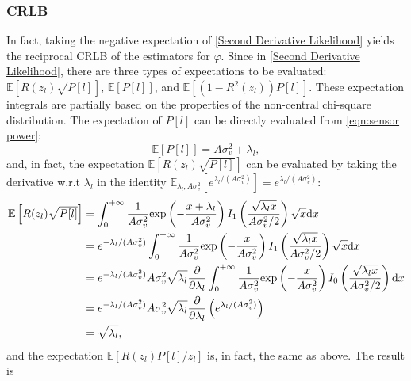 \documentclass[12pt,draftclsnofoot,journal,onecolumn]{IEEEtran}
\theoremstyle{nonumberplain}
\def \exp {\text{exp}}
\begin{document}
\subsubsection{CRLB}
    In fact, taking the negative expectation of \eqref{Second Derivative Likelihood} yields the reciprocal CRLB of the estimators for $\hat{\varphi}$. Since in \eqref{Second Derivative Likelihood}, there are three types of expectations to be evaluated: $\mathbb{E}\left[R(z_l)\sqrt{P[l]}\right]$, $\mathbb{E}\left[P[l]\right]$, and $\mathbb{E}\left[(1-R^2(z_l))P[l]\right]$. These expectation integrals are partially based on the properties of the non-central chi-square distribution. The expectation of $P[l]$ can be directly evaluated from \eqref{eqn:sensor power}:
    \begin{equation}
        \mathbb{E}\left[P[l]\right] = A\sigma_v^2 + \lambda_l,
        \label{eqn:expectation of P_l}
    \end{equation}
    and, in fact, the expectation $\mathbb{E}\left[R(z_l) \sqrt{P[l]}\right]$ can be evaluated by taking the derivative w.r.t $\lambda_l$ in the identity $\mathbb{E}_{\lambda_l, A\sigma_v^2}[e^{\lambda_l/(A\sigma_v^2)}]=e^{\lambda_l/(A\sigma_v^2)}$:
    \begin{equation}
        \begin{aligned}
            \mathbb{E}\left[R(z_l) \sqrt{P[l]}\right] & = \int_{0}^{+\infty}{\frac{1}{A\sigma_v^2}\exp\left(-\frac{x+\lambda_l}{A\sigma_v^2}\right)I_1\left(\frac{\sqrt{\lambda_l x}}{A\sigma_v^2/2}\right)\sqrt{x}{\rm d}x}\\
            & = e^{-\lambda_l/(A\sigma_v^2)}\int_{0}^{+\infty}{\frac{1}{A\sigma_v^2}\exp\left(-\frac{x}{A\sigma_v^2}\right)I_1\left(\frac{\sqrt{\lambda_l x}}{A\sigma_v^2/2}\right)\sqrt{x}{\rm d}x} \\
            & = e^{-\lambda_l/(A\sigma_v^2)} A\sigma_v^2 \sqrt{\lambda_l} \frac{\partial}{\partial\lambda_l} \int_{0}^{+\infty}{\frac{1}{A\sigma_v^2}\exp\left(-\frac{x}{A\sigma_v^2}\right)I_0\left(\frac{\sqrt{\lambda_l x}}{A\sigma_v^2/2}\right) {\rm d}x}\\
            & = e^{-\lambda_l/(A\sigma_v^2)} A\sigma_v^2 \sqrt{\lambda_l} \frac{\partial}{\partial\lambda_l} \left(e^{\lambda_l/(A\sigma_v^2)}\right)\\
            & = \sqrt{\lambda_l},\\
        \end{aligned}
    \end{equation}
    and the expectation $\mathbb{E}\left[R(z_l)P[l]/z_l\right]$ is, in fact, the same as above. The result is
\end{document}
